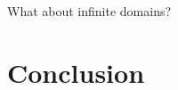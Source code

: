 \documentclass[letterpaper]{article}
\begin{document}
What about infinite domains?

\section{Conclusion}
\label{Conclusion}



\end{document}
